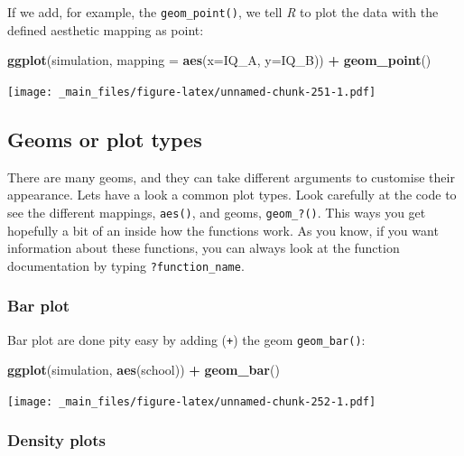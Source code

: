 \documentclass[
]{scrartcl}
\newenvironment{Shaded}{\begin{snugshade}}{\end{snugshade}}
\newcommand{\AttributeTok}[1]{\textcolor[rgb]{0.13,0.29,0.53}{#1}}
\newcommand{\FunctionTok}[1]{\textcolor[rgb]{0.13,0.29,0.53}{\textbf{#1}}}
\newcommand{\NormalTok}[1]{#1}
\newcommand{\SpecialCharTok}[1]{\textcolor[rgb]{0.81,0.36,0.00}{\textbf{#1}}}
\begin{document}
If we add, for example, the \texttt{geom\_point()}, we tell \emph{R} to plot the data with the defined aesthetic mapping as point:

\begin{Shaded}
\begin{Highlighting}[]
\FunctionTok{ggplot}\NormalTok{(simulation, }\AttributeTok{mapping =} \FunctionTok{aes}\NormalTok{(}\AttributeTok{x=}\NormalTok{IQ\_A, }\AttributeTok{y=}\NormalTok{IQ\_B)) }\SpecialCharTok{+} \FunctionTok{geom\_point}\NormalTok{()}
\end{Highlighting}
\end{Shaded}

\texttt{[image: \_main\_files/figure-latex/unnamed-chunk-251-1.pdf]}

\subsection{Geoms or plot types}\label{geoms-or-plot-types}

There are many geoms, and they can take different arguments to customise their appearance. Lets have a look a common plot types. Look carefully at the code to see the different mappings, \texttt{aes()}, and geoms, \texttt{geom\_?()}. This ways you get hopefully a bit of an inside how the functions work. As you know, if you want information about these functions, you can always look at the function documentation by typing \texttt{?function\_name}.

\subsubsection{Bar plot}\label{bar-plot}

Bar plot are done pity easy by adding (\texttt{+}) the geom \texttt{geom\_bar()}:

\begin{Shaded}
\begin{Highlighting}[]
\FunctionTok{ggplot}\NormalTok{(simulation, }\FunctionTok{aes}\NormalTok{(school)) }\SpecialCharTok{+}
        \FunctionTok{geom\_bar}\NormalTok{()}
\end{Highlighting}
\end{Shaded}

\texttt{[image: \_main\_files/figure-latex/unnamed-chunk-252-1.pdf]}

\subsubsection{Density plots}\label{density-plots}
\end{document}
